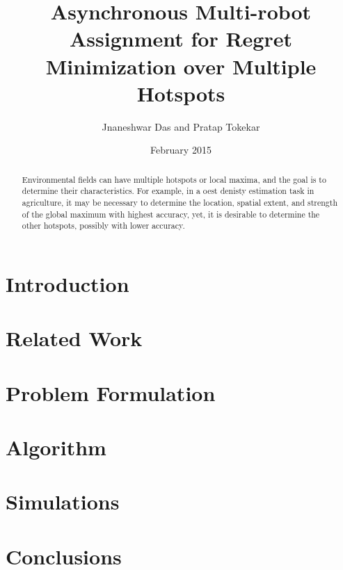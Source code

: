 \documentclass{article}
\title{Asynchronous Multi-robot Assignment for Regret Minimization over Multiple Hotspots}
\author{Jnaneshwar Das and Pratap Tokekar}
\date{February 2015}
\begin{document}
\maketitle

\begin{abstract}
Environmental fields can have multiple hotspots or local maxima, and the goal is to determine their characteristics. For example, in a oest denisty estimation task in agriculture, it may be necessary to determine the location, spatial extent, and strength of the global maximum with highest accuracy, yet, it is desirable to determine the other hotspots, possibly with lower accuracy. 



\end{abstract}


\section{Introduction}

\section{Related Work}

\section{Problem Formulation}

\section{Algorithm}

\section{Simulations}

\section{Conclusions}
\end{document}

